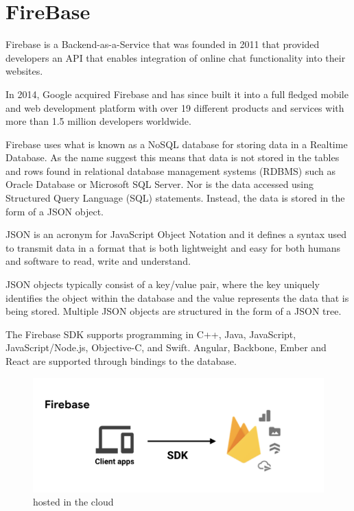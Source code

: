 \section{FireBase}
Firebase is a Backend-as-a-Service that was founded in 2011 that provided developers an API that enables integration of online chat functionality into their websites. 

In 2014, Google acquired Firebase and has since built it into a full fledged mobile and web development platform with over 19 different products and services with more than 1.5 million developers worldwide.

Firebase uses what is known as a NoSQL database for storing data in a Realtime Database. As the name suggest this means that data is not stored in the tables and rows found in relational database management systems (RDBMS) such as Oracle Database or Microsoft SQL Server. Nor is the data accessed using Structured Query Language (SQL) statements. Instead, the data is stored in the form of a JSON object. 

JSON is an acronym for JavaScript Object Notation and it defines a syntax used to transmit data in a format that is both lightweight and easy for both humans and software to read, write and understand.

JSON objects typically consist of a key/value pair, where the key uniquely identifies the object within the database and the value represents the data that is being stored. Multiple JSON objects are structured in the form of a JSON tree.

The Firebase SDK supports programming in C++, Java, JavaScript, JavaScript/Node.js, Objective-C, and Swift. Angular, Backbone, Ember and React are supported through bindings to the database.

\begin{figure}
    \centering
    \includegraphics[scale=0.7]{img/firebase2.PNG}
    \caption{hosted in the cloud}
    \label{fig:my_label4}
\end{figure}


